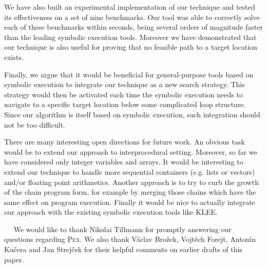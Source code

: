 \documentclass{llncs}
\newcommand{\Pex}{\textsc{Pex}\xspace}
\newcommand{\Klee}{\textsc{KLEE}\xspace}
\renewcommand{\paragraph}[1]{\vspace{0.2cm}\noindent{\bf #1}~~}
\begin{document}
We have also built an experimental implementation of our technique and tested its
effectiveness on a set of nine benchmarks. Our tool was able to correctly
solve each of these benchmarks within seconds, being several orders of
magnitude faster than the leading symbolic execution tools. Moreover we have
demonstrated that our technique is also useful for proving that no feasible
path to a target location exists.

Finally, we argue that it would be beneficial for general-purpose tools
based on symbolic execution to integrate our technique as a new search
strategy. This strategy would then be activated each time the symbolic
execution needs to navigate to  a specific target location below some
complicated loop structure. Since our algorithm is itself based on symbolic
execution, such integration should not be too difficult.

There are many interesting open directions for future work. An obvious task
would be to extend our approach to interprocedural setting.  Moreover, so far
we have considered only integer variables and arrays. It would be
interesting to extend our technique to handle more
sequential containers (e.g. lists or vectors) and/or floating point arithmetics. Another approach is to try to
curb the growth of the chain program form, for example by merging those
chains which have the same effect on program execution. Finally it would be
nice to actually integrate our approach with the existing symbolic execution
tools like \Klee.



\paragraph{Acknowledgements}
We would like to thank Nikolai Tillmann for promptly answering our questions
regarding \Pex. We also thank V\'aclav Bro\v{z}ek, Vojt\v{e}ch Forejt,
Anton\'\i n Ku\v{c}era  and
Jan Strej\v{c}ek for their helpful comments on earlier drafts of this paper.




\end{document}
